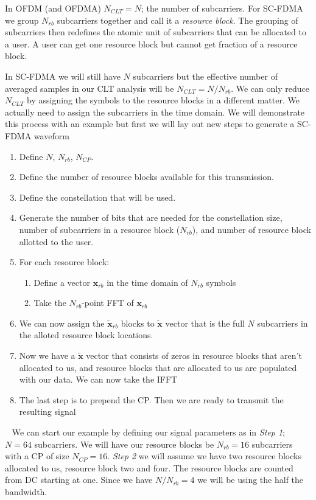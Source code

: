 In \ac{OFDM} (and \ac{OFDMA}) $N_{CLT}=N$; the number of subcarriers. For \ac{SC-FDMA} we group $N_{rb}$ subcarriers together and call it a \emph{resource block}. The grouping of subcarriers then redefines the atomic unit of subcarriers that can be allocated to a user. A user can get one resource block but cannot get fraction of a resource block.

In \ac{SC-FDMA} we will still have $N$ subcarriers but the effective number of averaged samples in our \ac{CLT} analysis will be $N_{CLT}=N/N_{rb}$. We can only reduce $N_{CLT}$ by assigning the symbols to the resource blocks in a different matter. We actually need to assign the subcarriers in the time domain. We will demonstrate this process with an example but first we will lay out new steps to generate a \ac{SC-FDMA} waveform

\begin{enumerate}
\item{Define $N$, $N_{rb}$, $N_{CP}$.}
\item{Define the number of resource blocks available for this transmission.}
\item{Define the constellation that will be used.}
\item{Generate the number of bits that are needed for the constellation size, number of subcarriers in a resource block ($N_{rb}$), and number of resource block allotted to the user.}
\item{For each resource block:}
 \begin{enumerate}
 \item{Define a vector $\mathbf{x}_{rb}$ in the time domain of $N_{rb}$ symbols}
 \item{Take the $N_{rb}$-point \ac{FFT} of $\mathbf{x}_{rb}$}
 \end{enumerate}
\item{We can now assign the $\tilde{\mathbf{x}}_{rb}$ blocks to $\tilde{\mathbf{x}}$ vector that is the full $N$ subcarriers in the alloted resource block locations.}
\item{Now we have a $\tilde{\mathbf{x}}$ vector that consists of zeros in resource blocks that aren't allocated to us, and resource blocks that are allocated to us are populated with our data. We can now take the \ac{IFFT}} 
\item{The last step is to prepend the \ac{CP}. Then we are ready to transmit the resulting signal}
\end{enumerate}
 
We can start our example by defining our signal parameters as in \emph{Step 1}; $N=64$ subcarriers. We will have our resource blocks be $N_{rb} = 16$ subcarriers with a \ac{CP} of size $N_{CP}=16$. \emph{Step 2} we will assume we have two resource blocks allocated to us, resource block two and four. The resource blocks are counted from \ac{DC} starting at one. Since we have $N/N_{rb}=4$ we will be using the half the bandwidth.

